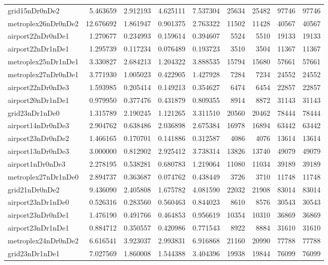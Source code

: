 \begin{longtable}{|l|r|r|r|r|r|r|r|r|}
grid15nDr0nDe2 & 5.463659 & 2.912193 & 4.625111 & 7.537304 & 25634 & 25482 & 97746 & 97746 \\
metroplex26nDr0nDe2 & 12.676692 & 1.861947 & 0.901375 & 2.763322 & 11502 & 11428 & 40567 & 40567 \\
airport22nDr0nDe1 & 1.270677 & 0.234993 & 0.159614 & 0.394607 & 5524 & 5510 & 19133 & 19133 \\
airport22nDr1nDe1 & 1.295739 & 0.117234 & 0.076489 & 0.193723 & 3510 & 3504 & 11367 & 11367 \\
metroplex25nDr1nDe1 & 3.330827 & 2.684213 & 1.204322 & 3.888535 & 15794 & 15680 & 57661 & 57661 \\
metroplex27nDr0nDe1 & 3.771930 & 1.005023 & 0.422905 & 1.427928 & 7284 & 7234 & 24552 & 24552 \\
airport22nDr0nDe3 & 1.593985 & 0.205414 & 0.149213 & 0.354627 & 6474 & 6454 & 22857 & 22857 \\
airport20nDr1nDe1 & 0.979950 & 0.377476 & 0.431879 & 0.809355 & 8914 & 8872 & 31143 & 31143 \\
grid23nDr1nDe0 & 1.315789 & 2.190245 & 1.121265 & 3.311510 & 20560 & 20462 & 78444 & 78444 \\
airport14nDr0nDe3 & 2.904762 & 0.638486 & 2.036898 & 2.675384 & 16978 & 16894 & 63442 & 63442 \\
airport23nDr0nDe2 & 1.466165 & 0.170701 & 0.141886 & 0.312587 & 4086 & 4076 & 13614 & 13614 \\
airport13nDr0nDe3 & 3.000000 & 0.812902 & 2.925412 & 3.738314 & 13826 & 13740 & 49079 & 49079 \\
airport1nDr0nDe3 & 2.278195 & 0.538281 & 0.680783 & 1.219064 & 11080 & 11034 & 39189 & 39189 \\
metroplex27nDr1nDe0 & 2.894737 & 0.363687 & 0.074762 & 0.438449 & 3726 & 3710 & 11748 & 11748 \\
grid21nDr0nDe2 & 9.436090 & 2.405808 & 1.675782 & 4.081590 & 22032 & 21908 & 83014 & 83014 \\
airport23nDr1nDe0 & 0.526316 & 0.283560 & 0.560463 & 0.844023 & 8610 & 8576 & 30543 & 30543 \\
airport23nDr0nDe1 & 1.476190 & 0.491766 & 0.464853 & 0.956619 & 10354 & 10310 & 36869 & 36869 \\
airport23nDr1nDe1 & 0.884712 & 0.350557 & 0.420986 & 0.771543 & 8922 & 8884 & 31610 & 31610 \\
metroplex24nDr0nDe2 & 6.616541 & 3.923037 & 2.993831 & 6.916868 & 21160 & 20990 & 77788 & 77788 \\
grid23nDr1nDe1 & 7.027569 & 1.860008 & 1.544388 & 3.404396 & 19938 & 19844 & 76099 & 76099 \\

\end{longtable}
